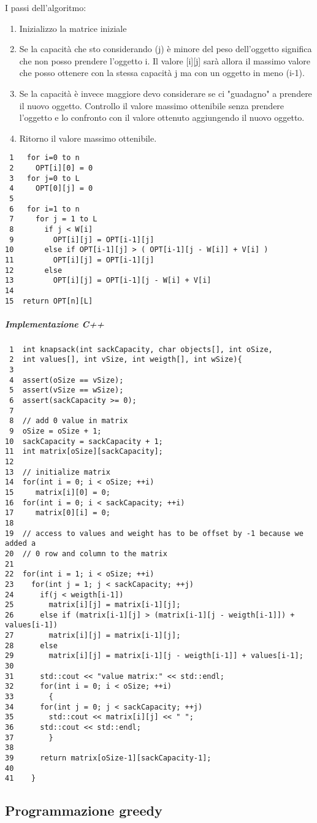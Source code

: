 \documentclass[11pt]{article}
\begin{document}
I passi dell'algoritmo:
\begin{enumerate}
\item Inizializzo la matrice iniziale
\item Se la capacità che sto considerando (j) è minore del peso dell'oggetto significa
che non posso prendere l'oggetto i. Il valore [i][j] sarà allora il massimo valore che posso ottenere
con la stessa capacità j ma con un oggetto in meno (i-1).
\item Se la capacità è invece maggiore devo considerare se ci "guadagno" a prendere il nuovo oggetto.
Controllo il valore massimo ottenibile senza prendere l'oggetto e lo confronto con il valore ottenuto
aggiungendo il nuovo oggetto.
\item Ritorno il valore massimo ottenibile.
\end{enumerate}


\begin{verbatim}
 1   for i=0 to n
 2     OPT[i][0] = 0
 3   for j=0 to L
 4     OPT[0][j] = 0
 5  
 6   for i=1 to n
 7     for j = 1 to L
 8       if j < W[i]
 9         OPT[i][j] = OPT[i-1][j]
10       else if OPT[i-1][j] > ( OPT[i-1][j - W[i]] + V[i] )
11         OPT[i][j] = OPT[i-1][j]
12       else
13         OPT[i][j] = OPT[i-1][j - W[i] + V[i]
14  
15  return OPT[n][L]
\end{verbatim}


\subparagraph{Implementazione C++}
\label{sec:orgbe31195}

\begin{verbatim}
 1  int knapsack(int sackCapacity, char objects[], int oSize,
 2  int values[], int vSize, int weigth[], int wSize){
 3  
 4  assert(oSize == vSize);
 5  assert(vSize == wSize);
 6  assert(sackCapacity >= 0);
 7  
 8  // add 0 value in matrix
 9  oSize = oSize + 1;
10  sackCapacity = sackCapacity + 1;
11  int matrix[oSize][sackCapacity];
12  
13  // initialize matrix
14  for(int i = 0; i < oSize; ++i)
15     matrix[i][0] = 0;
16  for(int i = 0; i < sackCapacity; ++i)
17     matrix[0][i] = 0;
18  
19  // access to values and weight has to be offset by -1 because we added a
20  // 0 row and column to the matrix
21  
22  for(int i = 1; i < oSize; ++i)
23    for(int j = 1; j < sackCapacity; ++j)
24      if(j < weigth[i-1])
25        matrix[i][j] = matrix[i-1][j];
26      else if (matrix[i-1][j] > (matrix[i-1][j - weigth[i-1]]) + values[i-1])
27        matrix[i][j] = matrix[i-1][j];
28      else
29        matrix[i][j] = matrix[i-1][j - weigth[i-1]] + values[i-1];
30  
31      std::cout << "value matrix:" << std::endl;
32      for(int i = 0; i < oSize; ++i)
33        {
34  	for(int j = 0; j < sackCapacity; ++j)
35  	  std::cout << matrix[i][j] << " ";
36  	std::cout << std::endl;	
37        }
38  
39      return matrix[oSize-1][sackCapacity-1];
40  
41    }
\end{verbatim}


\subsection{Programmazione greedy}
\label{sec:orgf546894}
\end{document}
